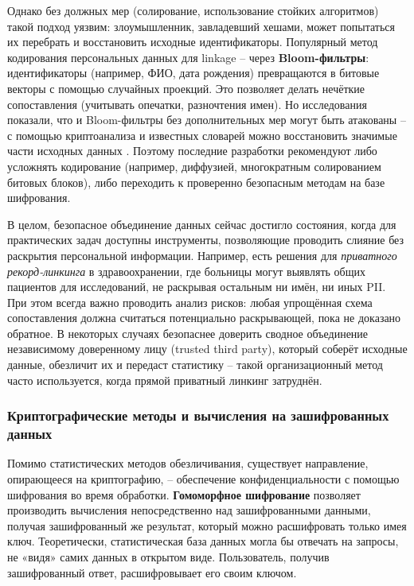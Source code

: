 Однако без должных мер (солирование, использование стойких алгоритмов) такой подход уязвим: злоумышленник, завладевший хешами, может 
попытаться их перебрать и восстановить исходные идентификаторы. Популярный метод кодирования персональных данных для linkage –
через \textbf{Bloom-фильтры}: идентификаторы (например, ФИО, дата рождения) превращаются в битовые векторы с помощью
случайных проекций. Это позволяет делать нечёткие сопоставления (учитывать опечатки, разночтения имен). Но исследования
показали, что и Bloom-фильтры без дополнительных мер могут быть атакованы – с помощью криптоанализа и известных словарей
можно восстановить значимые части исходных данных \autocite{journalprivacyconfidentiality-org}. Поэтому последние
разработки рекомендуют либо усложнять кодирование (например, диффузией, многократным солированием битовых блоков), либо
переходить к проверенно безопасным методам на базе шифрования.


В целом, безопасное объединение данных сейчас достигло
состояния, когда для практических задач доступны инструменты, позволяющие проводить слияние без раскрытия персональной
информации. Например, есть решения для \textit{приватного рекорд-линкинга} в здравоохранении, где больницы могут
выявлять общих пациентов для исследований, не раскрывая остальным ни имён, ни иных PII. При этом всегда важно проводить
анализ рисков: любая упрощённая схема сопоставления должна считаться потенциально раскрывающей, пока не доказано
обратное. В некоторых случаях безопаснее доверить сводное объединение независимому доверенному лицу (trusted third
party), который соберёт исходные данные, обезличит их и передаст статистику – такой организационный метод часто
используется, когда прямой приватный линкинг затруднён.

\subsubsection{Криптографические методы и вычисления на зашифрованных данных}

Помимо статистических методов обезличивания, существует направление, опирающееся на криптографию, – обеспечение
конфиденциальности с помощью шифрования во время обработки. \textbf{Гомоморфное шифрование} позволяет производить
вычисления непосредственно над зашифрованными данными, получая зашифрованный же результат, который можно расшифровать
только имея ключ. Теоретически, статистическая база данных могла бы отвечать на запросы, не «видя» самих данных в
открытом виде. Пользователь, получив зашифрованный ответ, расшифровывает его своим ключом.

